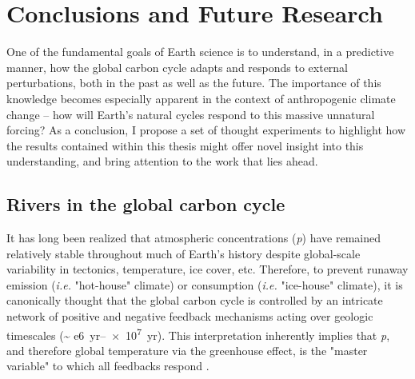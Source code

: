 \chapter{Conclusions and Future Research}
\label{Ch7}

\raggedbottom
\clearpage

One of the fundamental goals of Earth science is to understand, in a predictive manner, how the global carbon cycle adapts and responds to external perturbations, both in the past as well as the future. The importance of this knowledge becomes especially apparent in the context of anthropogenic climate change -- how will Earth's natural cycles respond to this massive unnatural forcing? As a conclusion, I propose a set of thought experiments to highlight how the results contained within this thesis might offer novel insight into this understanding, and bring attention to the work that lies ahead.

\section{Rivers in the global carbon cycle}

It has long been realized that atmospheric  concentrations (\textit{p}) have remained relatively stable throughout much of Earth's history despite global-scale variability in tectonics, temperature, ice cover, etc. Therefore, to prevent runaway  emission (\textit{i.e.} "hot-house" climate) or consumption (\textit{i.e.} "ice-house" climate), it is canonically thought that the global carbon cycle is controlled by an intricate network of positive and negative feedback mechanisms acting over geologic timescales (\SIrange{~ e6}{e7}{yr}). This interpretation inherently implies that \textit{p}, and therefore global temperature via the greenhouse effect, is the "master variable" to which all feedbacks respond \citep[Figure \ref{Ch7Fig:1}][]{Ebelman:1845uw,Berner:1999wj}.

